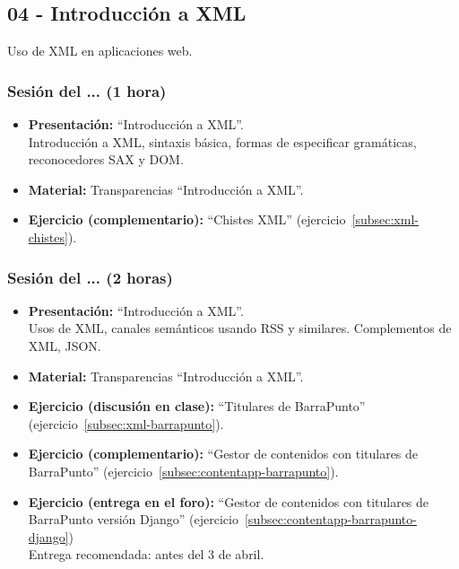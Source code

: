 \documentclass[a4paper,12pt]{article}
\begin{document}
\subsection{04 - Introducción a XML}

Uso de XML en aplicaciones web.

\subsubsection{Sesión del ... (1 hora)}

\begin{itemize}
\item \textbf{Presentación:} ``Introducción a XML''. \\
 Introducción a XML, sintaxis básica, formas de especificar gramáticas, reconocedores SAX y DOM.
\item \textbf{Material:} Transparencias ``Introducción a XML''.
\item \textbf{Ejercicio (complementario):} ``Chistes XML'' (ejercicio~\ref{subsec:xml-chistes}).
\end{itemize}

\subsubsection{Sesión del ... (2 horas)}

\begin{itemize}
\item \textbf{Presentación:} ``Introducción a XML''. \\
Usos de XML, canales semánticos usando RSS y similares. Complementos de XML, JSON.

\item \textbf{Material:} Transparencias ``Introducción a XML''.

\item \textbf{Ejercicio (discusión en clase):} ``Titulares de BarraPunto'' (ejercicio~\ref{subsec:xml-barrapunto}). 

\item \textbf{Ejercicio (complementario):} ``Gestor de contenidos con titulares de BarraPunto'' (ejercicio~\ref{subsec:contentapp-barrapunto}). 

\item \textbf{Ejercicio (entrega en el foro):} ``Gestor de contenidos con titulares de BarraPunto versión Django'' (ejercicio~\ref{subsec:contentapp-barrapunto-django}) \\
Entrega recomendada: antes del 3 de abril.
\end{itemize}
\end{document}
